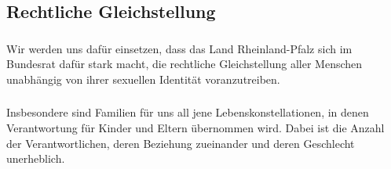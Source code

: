 \subsection*{Rechtliche Gleichstellung}

\subsubsection{ }
\abstimmung
Wir werden uns dafür einsetzen, dass das Land Rheinland-Pfalz sich im Bundesrat dafür stark macht, die rechtliche Gleichstellung aller Menschen unabhängig von ihrer sexuellen Identität voranzutreiben.

\subsubsection{ }
\abstimmung
Insbesondere sind Familien für uns all jene Lebenskonstellationen, in denen Verantwortung für Kinder und Eltern übernommen wird. Dabei ist die Anzahl der Verantwortlichen, deren Beziehung zueinander und deren Geschlecht unerheblich.
